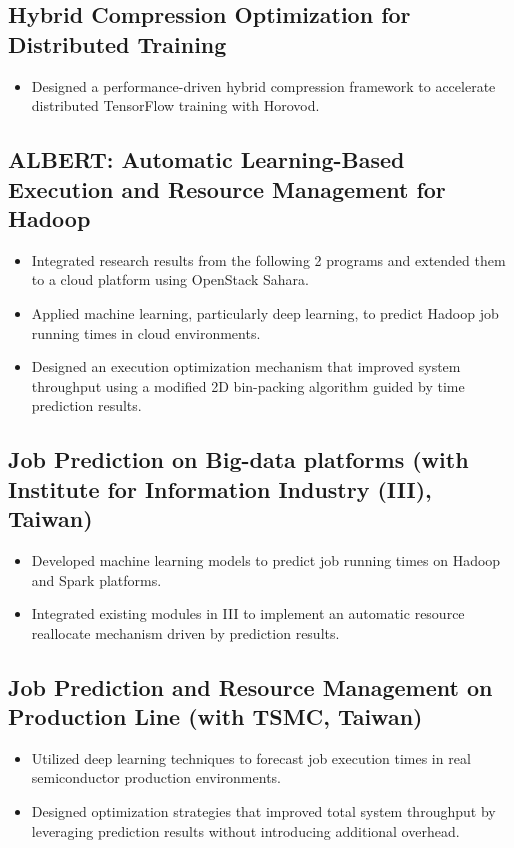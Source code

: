 \documentclass[10pt,a4paper,sans]{moderncv}          %
\begin{document}
\subsection{Hybrid Compression Optimization for Distributed Training~\cite{CHEN2023104719}}
\begin{itemize}
    \item Designed a performance-driven hybrid compression framework to accelerate distributed TensorFlow training with Horovod.
\end{itemize}

\subsection{ALBERT: Automatic Learning-Based Execution and Resource Management for Hadoop~\cite{CHEN202245}}
\begin{itemize}
    \item Integrated research results from the following 2 programs and extended them to a cloud platform using OpenStack Sahara.
    \item Applied machine learning, particularly deep learning, to predict Hadoop job running times in cloud environments.
    \item Designed an execution optimization mechanism that improved system throughput using a modified 2D bin-packing algorithm guided by time prediction results.
\end{itemize}

\subsection{Job Prediction on Big-data platforms (with Institute for Information Industry (III), Taiwan)~\cite{datacom17-prediction}}
\begin{itemize}
    \item Developed machine learning models to predict job running times on Hadoop and Spark platforms.
    \item Integrated existing modules in III to implement an automatic resource reallocate mechanism driven by prediction results.
\end{itemize}

\subsection{Job Prediction and Resource Management on Production Line (with TSMC, Taiwan)}
\begin{itemize}
    \item Utilized deep learning techniques to forecast job execution times in real semiconductor production environments.
    \item Designed optimization strategies that improved total system throughput by leveraging prediction results without introducing additional overhead.
\end{itemize}
\end{document}
